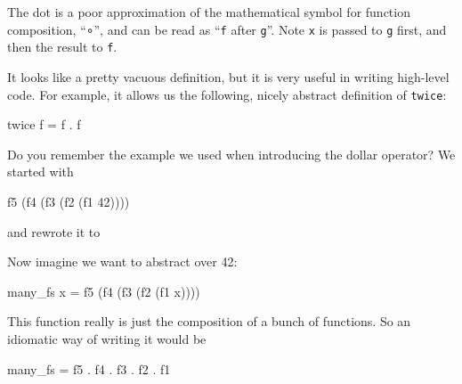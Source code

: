 \documentclass[11pt,
  american,
  DIV13]{article}
\newenvironment{Shaded}{}{}
\newcommand{\DecValTok}[1]{\textcolor[rgb]{0.25,0.63,0.44}{#1}}
\newcommand{\NormalTok}[1]{#1}
\newcommand{\OperatorTok}[1]{\textcolor[rgb]{0.40,0.40,0.40}{#1}}
\newcommand{\OtherTok}[1]{\textcolor[rgb]{0.00,0.44,0.13}{#1}}
\begin{document}
The dot is a poor approximation of the mathematical symbol for function
composition, ``∘'', and can be read as ``\texttt{f} after \texttt{g}''.
Note \texttt{x} is passed to \texttt{g} first, and then the result to
\texttt{f}.

It looks like a pretty vacuous definition, but it is very useful in
writing high-level code. For example, it allows us the following, nicely
abstract definition of \texttt{twice}:

\begin{Shaded}
\begin{Highlighting}[]
\NormalTok{twice f }\OtherTok{=}\NormalTok{ f }\OperatorTok{.}\NormalTok{ f}
\end{Highlighting}
\end{Shaded}

Do you remember the example we used when introducing the dollar
operator? We started with

\begin{Shaded}
\begin{Highlighting}[]
\NormalTok{f5 (f4 (f3 (f2 (f1 }\DecValTok{42}\NormalTok{))))}
\end{Highlighting}
\end{Shaded}

and rewrote it to

\begin{Shaded}
\end{Shaded}

Now imagine we want to abstract over 42:

\begin{Shaded}
\begin{Highlighting}[]
\NormalTok{many\_fs x }\OtherTok{=}\NormalTok{ f5 (f4 (f3 (f2 (f1 x))))}
\end{Highlighting}
\end{Shaded}

This function really is just the composition of a bunch of functions. So
an idiomatic way of writing it would be

\begin{Shaded}
\begin{Highlighting}[]
\NormalTok{many\_fs  }\OtherTok{=}\NormalTok{ f5 }\OperatorTok{.}\NormalTok{ f4 }\OperatorTok{.}\NormalTok{ f3 }\OperatorTok{.}\NormalTok{ f2 }\OperatorTok{.}\NormalTok{ f1}
\end{Highlighting}
\end{Shaded}
\end{document}
